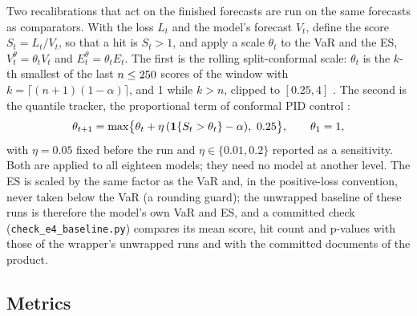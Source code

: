Two recalibrations that act on the finished forecasts are run on the same forecasts as comparators. With the loss $L_t$ and the model's forecast $V_t$, define the score $S_t = L_t/V_t$, so that a hit is $S_t > 1$, and apply a scale $\theta_t$ to the VaR and the ES, $V_t^{\theta} = \theta_t V_t$ and $E_t^{\theta} = \theta_t E_t$.
The first is the rolling split-conformal scale: $\theta_t$ is the $k$-th smallest of the last $n \le 250$ scores of the window with $k = \lceil (n+1)(1-\alpha)\rceil$, and 1 while $k > n$, clipped to $[0.25, 4]$ \citep{vovk2005,lei2018,barber2023}.
The second is the quantile tracker, the proportional term of conformal PID control \citep{angelopoulos2023}:
\begin{equation}
\theta_{t+1} = \max\bigl\{\theta_t + \eta\,(\mathbf{1}\{S_t > \theta_t\} - \alpha),\ 0.25\bigr\}, \qquad \theta_1 = 1,
\label{eq:tracker}
\end{equation}
with $\eta = 0.05$ fixed before the run and $\eta \in \{0.01, 0.2\}$ reported as a sensitivity. Both are applied to all eighteen models; they need no model at another level. The ES is scaled by the same factor as the VaR and, in the positive-loss convention, never taken below the VaR (a rounding guard); the unwrapped baseline of these runs is therefore the model's own VaR and ES, and a committed check (\texttt{check\_e4\_baseline.py}) compares its mean score, hit count and p-values with those of the wrapper's unwrapped runs and with the committed documents of the product.

\subsection{Metrics}
\label{sec:design-metrics}

